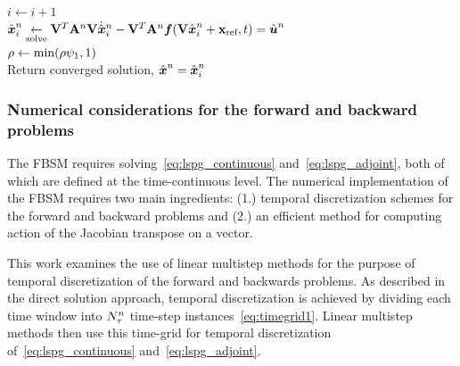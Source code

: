 \begin{algorithm}
{$i \leftarrow i+1$ \\
$\hat{ \boldsymbol x}^{n}_i \underset{\text{solve}}{\leftarrow} \mathbf {V}^T \mathbf{A}^{n} \mathbf {V} \dot{\hat{ \boldsymbol x}}^{n}_i   -  \mathbf {V}^T \mathbf{A}^{n} \boldsymbol f(\mathbf {V} \hat{ \boldsymbol x}^n_i + \mathbf{x}_\text{ref},t) =  {\hat{\boldsymbol u}^{n}} $
\\
{
$\rho \leftarrow \text{min}(\rho \psi_1,1)$ \\
}
}
Return converged solution, $\hat{ \boldsymbol x}^{n}= \hat{ \boldsymbol x}^{n}_i$
\end{algorithm}
\subsubsection{Numerical considerations for the forward and backward problems}
The FBSM requires solving~\eqref{eq:lspg_continuous} and~\eqref{eq:lspg_adjoint}, both of which are defined at the time-continuous level. 
The numerical implementation of the FBSM requires two main ingredients: (1.) temporal discretization schemes for the forward and backward problems and (2.) 
an efficient method for computing action of the Jacobian transpose on a vector.  

This work examines the use of linear multistep methods for the purpose of temporal discretization of the forward and 
backwards problems. As described in  
the direct solution approach, temporal discretization is achieved by dividing each time window into $N_{\tau}^{n}$ time-step instances~\eqref{eq:timegrid1}. Linear multistep methods then use this time-grid for temporal discretization of~\eqref{eq:lspg_continuous} and~\eqref{eq:lspg_adjoint}. 

